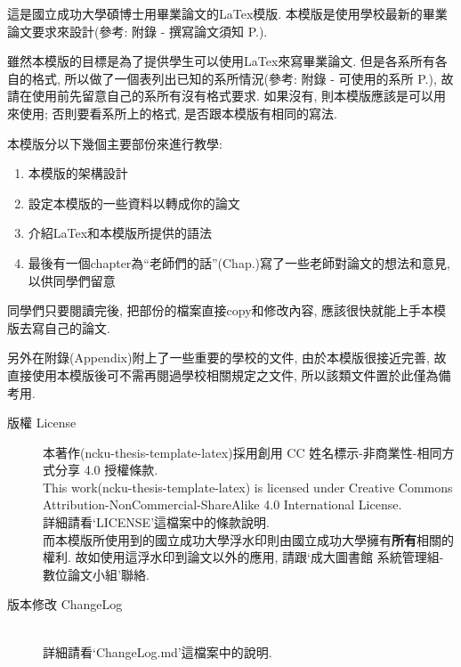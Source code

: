 
這是國立成功大學碩博士用畢業論文的LaTex模版. 本模版是使用學校最新的畢業論文要求來設計(參考: 附錄 - 撰寫論文須知 P.).

雖然本模版的目標是為了提供學生可以使用LaTex來寫畢業論文. 但是各系所有各自的格式, 所以做了一個表列出已知的系所情況(參考: 附錄 - 可使用的系所 P.), 故請在使用前先留意自己的系所有沒有格式要求. 如果沒有, 則本模版應該是可以用來使用; 否則要看系所上的格式, 是否跟本模版有相同的寫法.

本模版分以下幾個主要部份來進行教學:
\begin{enumerate}
  \item 本模版的架構設計
  \item 設定本模版的一些資料以轉成你的論文
  \item 介紹LaTex和本模版所提供的語法
  \item 最後有一個chapter為``老師們的話''(Chap.)寫了一些老師對論文的想法和意見, 以供同學們留意
\end{enumerate}
同學們只要閱讀完後, 把部份的檔案直接copy和修改內容, 應該很快就能上手本模版去寫自己的論文.

另外在附錄(Appendix)附上了一些重要的學校的文件, 由於本模版很接近完善, 故直接使用本模版後可不需再閱過學校相關規定之文件, 所以該類文件置於此僅為備考用.

\newpage

\begin{description}
  \item[版權 License] \hfill

    本著作(ncku-thesis-template-latex)採用創用 CC 姓名標示-非商業性-相同方式分享 4.0 授權條款.\\

    This work(ncku-thesis-template-latex) is licensed under Creative Commons Attribution-NonCommercial-ShareAlike 4.0 International License.\\

  詳細請看`LICENSE'這檔案中的條款說明.\\

  而本模版所使用到的國立成功大學浮水印則由國立成功大學擁有\textbf{所有}相關的權利. 故如使用這浮水印到論文以外的應用, 請跟`成大圖書館 系統管理組-數位論文小組'聯絡.\\

  \item[版本修改 ChangeLog] \hfill\\
  詳細請看`ChangeLog.md'這檔案中的說明.
\end{description}

\EndChapter
